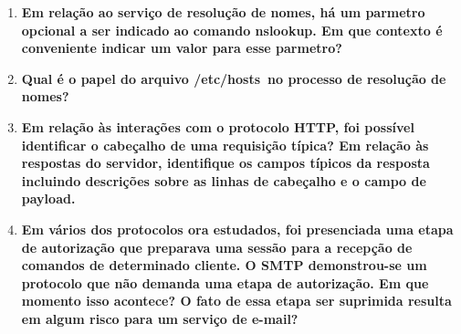 \begin{enumerate}
  \item \textbf{Em relação ao serviço de resolução de nomes, há um parmetro opcional a ser indicado ao
    comando nslookup. Em que contexto é conveniente indicar um valor para esse
  parmetro?}

\item \textbf{Qual é o papel do arquivo /etc/hosts no processo de resolução de nomes?}

  \item \textbf{Em relação às interações com o protocolo HTTP, foi possível identificar o cabeçalho de uma
    requisição típica? Em relação às respostas do servidor, identifique os campos típicos da
  resposta incluindo descrições sobre as linhas de cabeçalho e o campo de payload.}

  \item \textbf{Em vários dos protocolos ora estudados, foi presenciada uma etapa de autorização que
    preparava uma sessão para a recepção de comandos de determinado cliente. O SMTP
    demonstrou-se um protocolo que não demanda uma etapa de autorização. Em que momento
    isso acontece? O fato de essa etapa ser suprimida resulta em algum risco para um serviço de
  e-mail?}
\end{enumerate}
